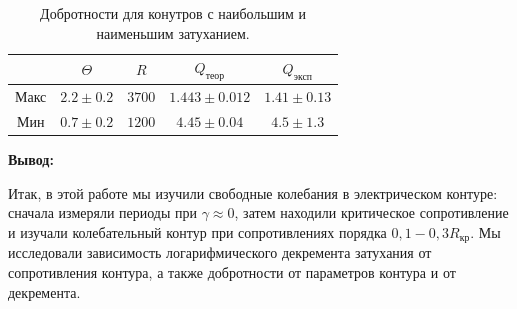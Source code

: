 \documentclass[a4paper,12pt]{report}
\begin{document}
\begin{table}[h]
\centering
\begin{tabular}{|c|c|c|c|c|}
\hline
     & $\Theta$      & $R$    & $Q_{\text{теор}}$         & $Q_{\text{эксп}}$  \\ \hline
Макс & $2.2 \pm 0.2$ & $3700$ & $1.443 \pm 0.012$ & $1.41 \pm 0.13$ \\ \hline
Мин  & $0.7 \pm 0.2$ & $1200$ & $4.45 \pm 0.04$   & $4.5 \pm 1.3  $ \\ \hline
\end{tabular}
\caption{Добротности для конутров с наибольшим и наименьшим затуханием.}
\end{table}
\vspace{\baselineskip}
\noindent\textbf{Вывод:}

Итак, в этой работе мы изучили свободные колебания в электрическом контуре: сначала измеряли периоды при $ \gamma \approx 0 $, затем находили критическое сопротивление и изучали колебательный контур при сопротивлениях порядка $ 0,1 - 0,3 R_{кр}$. Мы исследовали зависимость логарифмического декремента затухания от сопротивления контура, а также добротности от параметров контура и от декремента. 
\end{document}
